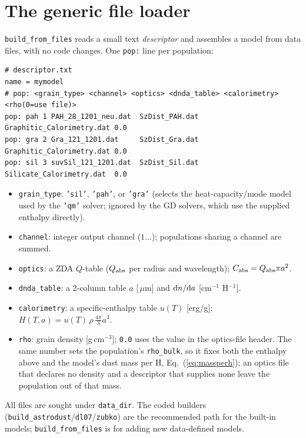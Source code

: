 \documentclass{my_memo}
\newcommand{\code}[1]{\texttt{#1}}
\newcommand{\um}{\ensuremath{\,\mu\mathrm{m}}}
\begin{document}
\section{The generic file loader}

\code{build\_from\_files} reads a small text \emph{descriptor} and assembles a
model from data files, with no code changes. One \code{pop:} line per
population:
\begin{lstlisting}[style=sh]
# descriptor.txt
name = mymodel
# pop: <grain_type> <channel> <optics> <dnda_table> <calorimetry> <rho(0=use file)>
pop: pah 1 PAH_28_1201_neu.dat  SzDist_PAH.dat Graphitic_Calorimetry.dat 0.0
pop: gra 2 Gra_121_1201.dat     SzDist_Gra.dat Graphitic_Calorimetry.dat 0.0
pop: sil 3 suvSil_121_1201.dat  SzDist_Sil.dat Silicate_Calorimetry.dat  0.0
\end{lstlisting}
\begin{itemize}
\item \code{grain\_type}: \code{'sil'}, \code{'pah'}, or \code{'gra'} (selects the
      heat-capacity/mode model used by the \code{'qm'} solver; ignored by the GD
      solvers, which use the supplied enthalpy directly).
\item \code{channel}: integer output channel ($1\dots$); populations sharing a
      channel are summed.
\item \code{optics}: a ZDA $Q$-table ($Q_{\rm abs}$ per radius and
      wavelength); $C_{\rm abs}=Q_{\rm abs}\pi a^2$.
\item \code{dnda\_table}: a 2-column table $a$ [\um] and ${\rm d}n/{\rm d}a$
      [cm$^{-1}$ H$^{-1}$].
\item \code{calorimetry}: a specific-enthalpy table $u(T)$ [erg/g];
      $H(T,a)=u(T)\,\rho\,\tfrac{4\pi}{3}a^3$.
\item \code{rho}: grain density [g\,cm$^{-3}$]; \code{0.0} uses the value in the
      optics-file header. The same number sets the population's
      \code{rho\_bulk}, so it fixes both the enthalpy above and the model's dust
      mass per H, Eq.~(\ref{eq:massperh}); an optics file that declares no
      density and a descriptor that supplies none leave the population out of
      that mass.
\end{itemize}
All files are sought under \code{data\_dir}. The coded builders
(\code{build\_astrodust}/\code{dl07}/\code{zubko}) are the recommended path for
the built-in models; \code{build\_from\_files} is for adding new data-defined
models.
\end{document}
